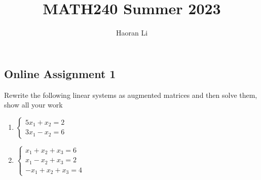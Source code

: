 \documentclass[a4paper,10pt]{article}
\title{MATH240 Summer 2023} %
\author{Haoran Li}
\date{}
\begin{document}
\sloppy %

\maketitle
\tableofcontents
\newpage



\subsection{Online Assignment 1}

\begin{problem}
Rewrite the following linear systems as augmented matrices and then solve them, show all your work
\begin{enumerate}
\item $\begin{cases}
5x_1+x_2=2\\
3x_1-x_2=6
\end{cases}$
\item $\begin{cases}
x_1+x_2+x_3=6\\
x_1-x_2+x_3=2\\
-x_1+x_2+x_3=4
\end{cases}$
\end{enumerate}
\end{problem}
\end{document}
